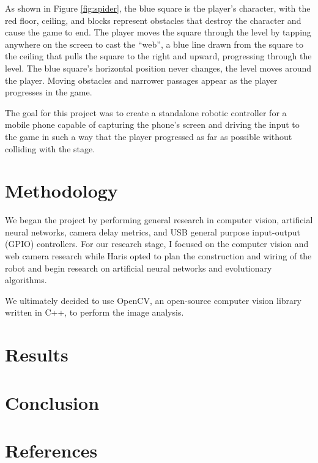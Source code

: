 \documentclass[twocolumn,a4paper,12pt]{article}
\begin{document}
As shown in Figure \ref{fig:spider}, the blue square is the player's character,
with the red floor, ceiling, and blocks represent obstacles that destroy the
character and cause the game to end. The player moves the square through the
level by tapping anywhere on the screen to cast the ``web'', a blue line drawn
from the square to the ceiling that pulls the square to the right and upward,
progressing through the level. The blue square's horizontal position never
changes, the level moves around the player. Moving obstacles and narrower
passages appear as the player progresses in the game.

The goal for this project was to create a standalone robotic controller for a
mobile phone capable of capturing the phone's screen and driving the input to
the game in such a way that the player progressed as far as possible without
colliding with the stage.

\section{Methodology}

We began the project by performing general research in computer vision,
artificial neural networks, camera delay metrics, and USB general purpose
input-output (GPIO) controllers. For our research stage, I focused on the
computer vision and web camera research while Haris opted to plan the
construction and wiring of the robot and begin research on artificial neural
networks and evolutionary algorithms.

We ultimately decided to use OpenCV, an open-source computer vision library
written in C++, to perform the image analysis. 

\section{Results}

\section{Conclusion}

\section{References}
\end{document}
